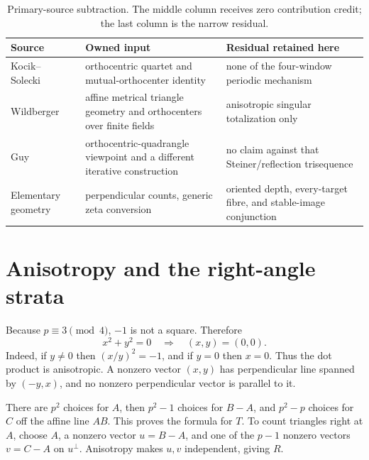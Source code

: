 \documentclass[a4paper,10pt]{amsart}
\theoremstyle{remark}
\begin{document}
\begin{table}[ht]
\centering
\small
\caption{Primary-source subtraction.  The middle column receives zero
contribution credit; the last column is the narrow residual.}
\label{tab:subtraction}
\begin{tabular}{@{}>{\raggedright\arraybackslash}p{}
                    >{\raggedright\arraybackslash}p{}
                    >{\raggedright\arraybackslash}p{}@{}}
\toprule
Source & Owned input & Residual retained here \\
\midrule
Kocik--Solecki~\cite{KocikSolecki2009}
& orthocentric quartet and mutual-orthocenter identity
& none of the four-window periodic mechanism \\
Wildberger~\cite{Wildberger2008}
& affine metrical triangle geometry and orthocenters over finite fields
& anisotropic singular totalization only \\
Guy~\cite{Guy2019}
& orthocentric-quadrangle viewpoint and a different iterative construction
& no claim against that Steiner/reflection trisequence \\
Elementary geometry
& perpendicular counts, generic zeta conversion
& oriented depth, every-target fibre, and stable-image conjunction \\
\bottomrule
\end{tabular}
\end{table}

\section{Anisotropy and the right-angle strata}\label{sec:counts}

Because $p\equiv3\pmod4$, $-1$ is not a square.  Therefore
\begin{equation}\label{eq:anisotropy}
 x^2+y^2=0\quad\Longrightarrow\quad (x,y)=(0,0).
\end{equation}
Indeed, if $y\neq0$ then $(x/y)^2=-1$, and if $y=0$ then $x=0$.
Thus the dot product is anisotropic.  A nonzero vector $(x,y)$ has
perpendicular line spanned by $(-y,x)$, and no nonzero perpendicular vector
is parallel to it.

There are $p^2$ choices for $A$, then $p^2-1$ choices for $B-A$, and
$p^2-p$ choices for $C$ off the affine line $AB$.  This proves the formula
for $T$.  To count triangles right at $A$, choose $A$, a nonzero vector
$u=B-A$, and one of the $p-1$ nonzero vectors $v=C-A$ on $u^\perp$.
Anisotropy makes $u,v$ independent, giving $R$.
\end{document}
